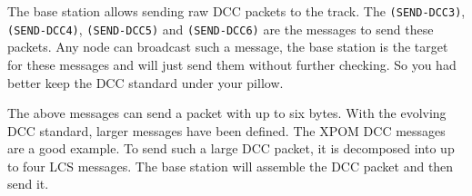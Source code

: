
The base station allows sending raw DCC packets to the track. The \texttt{(SEND-DCC3)}, \texttt{(SEND-DCC4)}, \texttt{(SEND-DCC5)} and \texttt{(SEND-DCC6)} are the messages to send these packets. Any node can broadcast such a message, the base station is the target for these messages and will just send them without further checking. So you had better keep the DCC standard under your pillow.

\begin{table}[ht!]
    \centering 
\end{table}

The above messages can send a packet with up to six bytes. With the evolving DCC standard, larger messages have been defined. The XPOM DCC messages are a good example. To send such a large DCC packet, it is decomposed into up to four LCS messages. The base station will assemble the DCC packet and then send it. 

\begin{table}[ht!]
    \centering 
\end{table}


